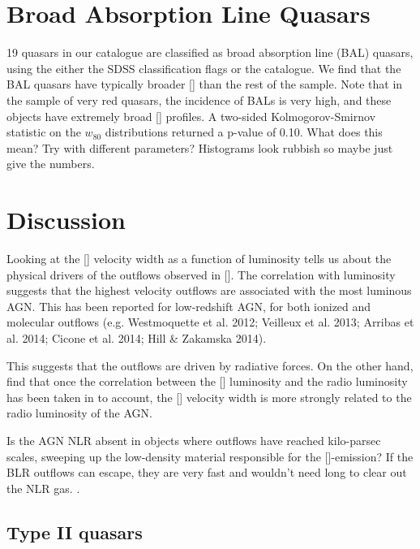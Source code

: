 \section{Broad Absorption Line Quasars}

19 quasars in our catalogue are classified as broad absorption line (BAL) quasars, using the either the \ac{SDSS} classification flags or the \citet{allen11} catalogue. 
We find that the BAL quasars have typically broader [] than the rest of the sample. 
Note that in the \citet{zakamska16} sample of very red quasars, the incidence of BALs is very high, and these objects have extremely broad [] profiles. 
A two-sided Kolmogorov-Smirnov statistic on the $w_{80}$ distributions returned a p-value of 0.10. 
What does this mean?
Try with different parameters?
Histograms look rubbish so maybe just give the numbers. 

\section{Discussion}

Looking at the [] velocity width as a function of luminosity tells us about the physical drivers of the outflows observed in []. 
The correlation with luminosity suggests that the highest velocity outflows are associated with the most luminous \ac{AGN}. 
This has been reported for low-redshift \ac{AGN}, for both ionized and molecular outflows (e.g. Westmoquette et al. 2012; Veilleux et al. 2013; Arribas et al. 2014; Cicone et al. 2014; Hill \& Zakamska 2014).

This suggests that the outflows are driven by radiative forces. 
On the other hand, \citet{mullaney13} find that once the correlation between the [] luminosity and the radio luminosity has been taken in to account, the [] velocity width is more strongly related to the radio luminosity of the \ac{AGN}. 

Is the \ac{AGN} \ac{NLR} absent in objects where outflows have reached kilo-parsec scales, sweeping up the low-density material responsible for the []-emission?
If the \ac{BLR} outflows can escape, they are very fast and wouldn't need long to clear out the \ac{NLR} gas. 
. 

\subsection{Type II quasars}

